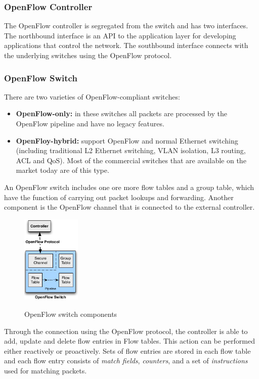 \subsubsection{OpenFlow Controller}

The OpenFlow controller is segregated from the switch and has two interfaces. The northbound interface is an API to the application layer for developing applications that control the network. The southbound interface connects with the underlying switches using the OpenFlow protocol.

\subsubsection{OpenFlow Switch}

There are two varieties \cite{ofspecification} of OpenFlow-compliant switches: 
\begin{itemize}
\item \textbf{OpenFlow-only:} in these switches all packets are processed by the OpenFlow pipeline and have no legacy features.
\item \textbf{OpenFloy-hybrid:} support OpenFlow and normal Ethernet switching (including traditional L2 Ethernet switching, VLAN isolation, L3 routing, ACL and QoS). Most of the commercial switches that are available on the market today are of this type.
\end{itemize}

An OpenFlow switch includes one ore more flow tables and a group table, which have the function of carrying out packet lookups and forwarding. Another component is the OpenFlow channel that is connected to the external controller.

\begin{figure}[H]
\centering
\includegraphics[width=0.25\textwidth]{images/fundamentals/openflow_switch_components.png}
\caption{OpenFlow switch components}  \cite{ofspecification}
\end{figure}

Through the connection using the OpenFlow protocol, the controller is able to add, update and delete flow entries in Flow tables.  This action can be performed either reactively or proactively. Sets of flow entries are stored in each flow table and each flow entry consists of \textit{match fields}, \textit{counters}, and a set of \textit{instructions} used for matching packets.

